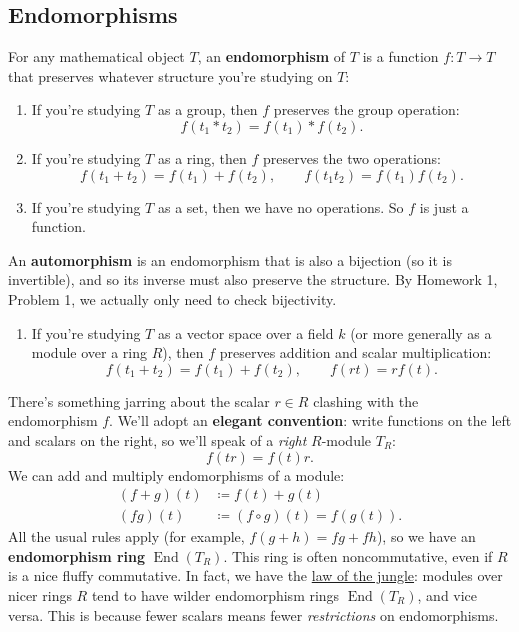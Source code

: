 \documentclass[12pt]{article}
\newcommand{\ita}[1]{\textit{#1}}
\theoremstyle{definition}
\DeclareMathOperator\End{End}
\begin{document}
\subsection{Endomorphisms}
For any mathematical object $T$, an \textbf{endomorphism} of $T$ is a function $f:T\to T$ that preserves whatever structure you're studying on $T$:
\begin{enumerate}
    \item If you're studying $T$ as a group, then $f$ preserves the group operation:
    \begin{equation}
        f(t_1\ast t_2)=f(t_1)\ast f(t_2).
    \end{equation}
    \item If you're studying $T$ as a ring, then $f$ preserves the two operations:
    \begin{equation}
        f(t_1+t_2)=f(t_1)+f(t_2),\qquad f(t_1t_2)=f(t_1)f(t_2).
    \end{equation}
    \item If you're studying $T$ as a set, then we have no operations. So $f$ is just a function. 
\end{enumerate}
An \textbf{automorphism} is an endomorphism that is also a bijection (so it is invertible), and so its inverse must also preserve the structure. By Homework 1, Problem 1, we actually only need to check bijectivity.
\begin{enumerate}[resume]
    \item If you're studying $T$ as a vector space over a field $k$ (or more generally as a module over a ring $R$), then $f$ preserves addition and scalar multiplication:
    \begin{equation}
        f(t_1+t_2)=f(t_1)+f(t_2),\qquad f(rt)=rf(t).
    \end{equation}
\end{enumerate}
There's something jarring about the scalar $r\in R$ clashing with the endomorphism $f$. We'll adopt an \textbf{elegant convention}: write functions on the left and scalars on the right, so we'll speak of a \ita{right} $R$-module $T_R$:
\begin{equation}
    f(tr)=f(t)r.
\end{equation}
We can add and multiply endomorphisms of a module:
\begin{equation}
    \begin{split}
        (f+g)(t)&\coloneqq f(t)+g(t)\\
        (fg)(t)&\coloneqq (f\circ g)(t)=f(g(t)).
    \end{split}
\end{equation}
All the usual rules apply (for example, $f(g+h)=fg+fh$), so we have an \textbf{endomorphism ring} $\End(T_R)$. This ring is often noncommutative, even if $R$ is a nice fluffy commutative. In fact, we have the \underline{law of the jungle}: modules over nicer rings $R$ tend to have wilder endomorphism rings $\End(T_R)$, and vice versa. This is because fewer scalars means fewer \ita{restrictions} on endomorphisms.
\end{document}
